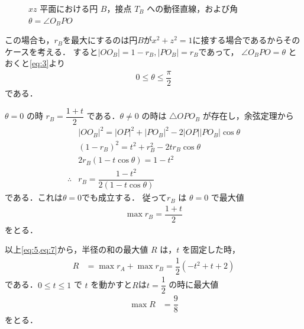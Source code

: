 \documentclass[../../main.tex]{subfiles}
\begin{document}
\begin{figure}[htb]
  \caption{$xz$ 平面における円 $B$，接点 $T_B$ への動径直線，および角 $\theta = \angle O_B P O$}
  \label{fig:circle_b_cosine_theorem_extended}
\end{figure}

この場合も，$r_B$を最大にするのは円$B$が$x^2+z^2=1$に接する場合であるからそのケースを考える．
すると$|OO_B| = 1 - r_B, |PO_B| = r_B$であって，
$\angle O_B PO = \theta$ とおくと\cref{eq:3}より
\begin{align}
  0 \le \theta \le \dfrac{\pi}{2} \label{eq:6}
\end{align}
である．

$\theta = 0$ の時 $r_B = \dfrac{1+t}{2}$ である．$\theta \neq 0$ の時は $\triangle OPO_B$ が存在し，余弦定理から
\begin{align}
  & |OO_B|^2 = |OP|^2 + |PO_B|^2 - 2|OP||PO_B|\cos\theta \\
  & (1 - r_B)^2 = t^2 + r_B^2 - 2t r_B \cos\theta \\
  & 2 r_B (1 - t\cos\theta) = 1 - t^2 \\
  \therefore
  & r_B = \dfrac{1-t^2}{2(1 - t\cos\theta)}
\end{align}
である．これは$\theta=0$でも成立する．
従って$r_B$ は $\theta = 0$ で最大値
\begin{align}
  \max r_B = \dfrac{1+t}{2} \label{eq:7}
\end{align}
をとる．
\casesend

以上\cref{eq:5,eq:7}から，半径の和の最大値 $R$ は，$t$ を固定した時，
\begin{align}
  R &= \max r_A + \max r_B = \dfrac{1}{2}(-t^2 + t + 2)
\end{align}
である．$0 \le t \le 1$ で $t$ を動かすと$R$は$t = \dfrac{1}{2}$ の時に最大値
\begin{align}
  \max R &= \dfrac{9}{8}
\end{align}
をとる．

\newpage
\end{document}
